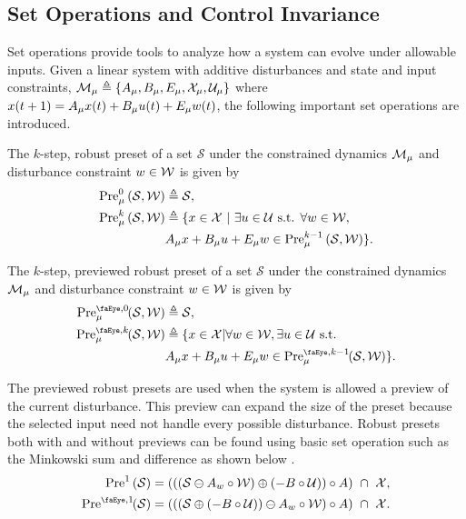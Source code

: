 \subsection{Set Operations and Control Invariance}
Set operations provide tools to analyze how a system can evolve under allowable inputs. Given a linear system with additive disturbances and state and input constraints, $\mode{\modeidx}\triangleq\{A_\modeidx, B_\modeidx, E_\modeidx,\xcon[\modeidx],\ucon[\modeidx]\}$ where $x(t+1)=A_{\mu} x(t)+ B_{\mu} u(t)+ E_{\mu} w(t)$, the following important set operations are introduced. 
\begin{definition}\label{def:robust_preset}
The $k$-step, robust preset of a set $\mathcal{S}$ under the constrained dynamics $\mode{\modeidx}$ and disturbance constraint $w\in\wcon$ is given by
\begin{align}
\Pre[\modeidx][0]{\mathcal{S},\wcon}&\triangleq\mathcal{S},\\
\Pre[\modeidx][k]{\mathcal{S},\wcon}&\triangleq\{x\in\xcon\ |\ \exists u\in\ucon\text{ s.t. }\forall w\in\wcon,\nonumber\\ &A_\modeidx x+ B_\modeidx u+ E_\modeidx w\in\Pre[\modeidx][k-1]{\mathcal{S},\wcon}\}.
\end{align}
\end{definition}
\begin{definition}\label{def:prev_robust_preset}
The $k$-step, previewed robust preset of a set $\mathcal{S}$ under the constrained dynamics $\mode{\modeidx}$ and disturbance constraint $w\in\wcon$ is given by
\begin{align}
\PreviewedPre[\modeidx][0]{\mathcal{S},\wcon}&\triangleq\mathcal{S},\\
\PreviewedPre[\modeidx][k]{\mathcal{S},\wcon}&\triangleq\{x\in\mathcal{X}|\forall w\in\mathcal{W},\exists u\in\mathcal{U}\text{ s.t. }\nonumber\\
&A_\modeidx x+ B_\modeidx u+ E_\modeidx w\in\PreviewedPre[\modeidx][k-1]{\mathcal{S},\wcon}\}.
\end{align}
\end{definition}
The previewed robust presets are used when the system is allowed a preview of the current disturbance. This preview can expand the size of the preset because the selected input need not handle every possible disturbance. Robust presets both with and without previews can be found using basic set operation such as the Minkowski sum and difference as shown below \cite{Borrelli2017}.
\begin{align}
\Pre[][1]{\mathcal{S}} &= \left(\left(\left(\mathcal{S}\ominus A_w\circ\mathcal{W}\right)\oplus\left(-B\circ\mathcal{U}\right)\right)\circ A\right)\ \cap\ \mathcal{X},\\
\PreviewedPre[][1]{\mathcal{S}} &= \left(\left(\left(\mathcal{S}\oplus\left(-B\circ\mathcal{U}\right)\right)\ominus A_w\circ\mathcal{W}\right)\circ A\right)\ \cap\ \mathcal{X}.
\end{align}

